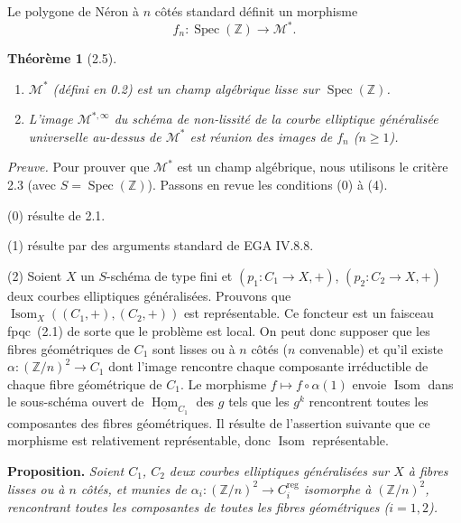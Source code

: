 \documentclass[11pt,a4paper]{amsart}
\theoremstyle{plain}
\newtheorem{theorem}{Th\'eor\`eme}[section]
\theoremstyle{definition}
\DeclareMathOperator{\Isom}{Isom}
\DeclareMathOperator{\Spec}{Spec}
\DeclareMathOperator{\reg}{reg}
\DeclareMathOperator{\Hom}{Hom}
\newcommand{\mll}{\mathcal{M}}
\newcommand{\uHom}{\underline{\Hom}}
\newcommand{\ZZ}{\mathbb{Z}}
\newcommand{\fpqc}{\textup{fpqc}}
\begin{document}
\subsubsection{}
Le polygone de N\'eron \`a $n$ c\^ot\'es standard d\'efinit un morphisme
\[
f_n \colon \Spec(\ZZ) \longrightarrow \mll^*.
\]

\begin{theorem}[2.5] \ \begin{enumerate}[label=(\roman*)]
\item $\mll^*$ (d\'efini en 0.2) est un champ alg\'ebrique lisse sur $\Spec(\ZZ)$.
\item L'image $\mll^{*,\infty}$ du sch\'ema de non-lissit\'e de la courbe elliptique g\'en\'eralis\'ee universelle au-dessus de $\mll^*$ est r\'eunion des images de $f_n$ ($n \geq 1$).
\end{enumerate}
\end{theorem}

\noindent\textit{Preuve.} Pour prouver que $\mll^*$ est un champ alg\'ebrique, nous utilisons le crit\`ere 2.3 (avec $S = \Spec(\ZZ)$). Passons en revue les conditions (0) \`a (4).

(0) r\'esulte de 2.1.

(1) r\'esulte par des arguments standard de EGA IV.8.8.

(2) Soient $X$ un $S$-sch\'ema de type fini et $(p_1 \colon C_1 \to X, +)$, $(p_2 \colon C_2 \to X, +)$ deux courbes elliptiques g\'en\'eralis\'ees. Prouvons que $\Isom_X((C_1,+),(C_2,+))$ est repr\'esentable. Ce foncteur est un faisceau \fpqc\ (2.1) de sorte que le probl\`eme est local. On peut donc supposer que les fibres g\'eom\'etriques de $C_1$ sont lisses ou \`a $n$ c\^ot\'es ($n$ convenable) et qu'il existe $\alpha \colon (\ZZ/n)^2 \to C_1$ dont l'image rencontre chaque composante irr\'eductible de chaque fibre g\'eom\'etrique de $C_1$. Le morphisme $f \mapsto f \circ \alpha(1)$ envoie $\Isom$ dans le sous-sch\'ema ouvert de $\uHom_{C_1}$ des $g$ tels que les $g^k$ rencontrent toutes les composantes des fibres g\'eom\'etriques. Il r\'esulte de l'assertion suivante que ce morphisme est relativement repr\'esentable, donc $\Isom$ repr\'esentable.

\medskip

\noindent\textbf{Proposition.} \textit{Soient $C_1$, $C_2$ deux courbes elliptiques g\'en\'eralis\'ees sur $X$ \`a fibres lisses ou \`a $n$ c\^ot\'es, et munies de $\alpha_i \colon (\ZZ/n)^2 \to C_i^{\reg}$ isomorphe \`a $(\ZZ/n)^2$, rencontrant toutes les composantes de toutes les fibres g\'eom\'etriques ($i=1,2$).}
\end{document}
